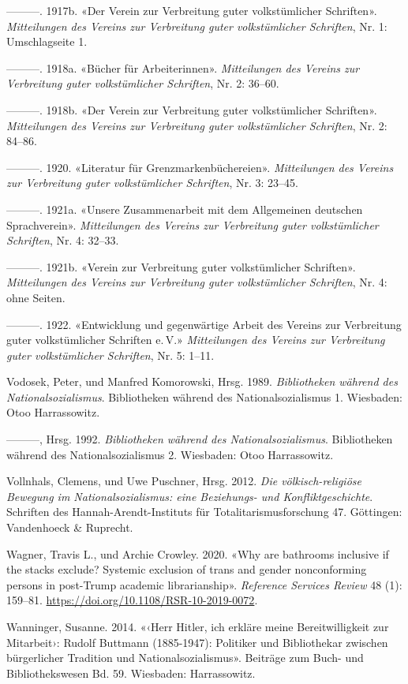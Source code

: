 \documentclass[a4paper,
fontsize=11pt,
oneside,
numbers=noperiodatend,
parskip=half-,
bibliography=totoc,
final
]{scrartcl}
\begin{document}
---------. 1917b. «Der Verein zur Verbreitung guter volkstümlicher
Schriften». \emph{Mitteilungen des Vereins zur Verbreitung guter
volkstümlicher Schriften}, Nr. 1: Umschlagseite 1.

---------. 1918a. «Bücher für Arbeiterinnen». \emph{Mitteilungen des
Vereins zur Verbreitung guter volkstümlicher Schriften}, Nr. 2: 36--60.

---------. 1918b. «Der Verein zur Verbreitung guter volkstümlicher
Schriften». \emph{Mitteilungen des Vereins zur Verbreitung guter
volkstümlicher Schriften}, Nr. 2: 84--86.

---------. 1920. «Literatur für Grenzmarkenbüchereien».
\emph{Mitteilungen des Vereins zur Verbreitung guter volkstümlicher
Schriften}, Nr. 3: 23--45.

---------. 1921a. «Unsere Zusammenarbeit mit dem Allgemeinen deutschen
Sprachverein». \emph{Mitteilungen des Vereins zur Verbreitung guter
volkstümlicher Schriften}, Nr. 4: 32--33.

---------. 1921b. «Verein zur Verbreitung guter volkstümlicher
Schriften». \emph{Mitteilungen des Vereins zur Verbreitung guter
volkstümlicher Schriften}, Nr. 4: ohne Seiten.

---------. 1922. «Entwicklung und gegenwärtige Arbeit des Vereins zur
Verbreitung guter volkstümlicher Schriften e.\,V.» \emph{Mitteilungen des
Vereins zur Verbreitung guter volkstümlicher Schriften}, Nr. 5: 1--11.

Vodosek, Peter, und Manfred Komorowski, Hrsg. 1989. \emph{Bibliotheken
während des Nationalsozialismus}. Bibliotheken während des
Nationalsozialismus 1. Wiesbaden: Otoo Harrassowitz.

---------, Hrsg. 1992. \emph{Bibliotheken während des
Nationalsozialismus}. Bibliotheken während des Nationalsozialismus 2.
Wiesbaden: Otoo Harrassowitz.

Vollnhals, Clemens, und Uwe Puschner, Hrsg. 2012. \emph{Die
völkisch-religiöse Bewegung im Nationalsozialismus: eine Beziehungs- und
Konfliktgeschichte}. Schriften des Hannah-Arendt-Instituts für
Totalitarismusforschung 47. Göttingen: Vandenhoeck \& Ruprecht.

Wagner, Travis L., und Archie Crowley. 2020. «Why are bathrooms
inclusive if the stacks exclude? Systemic exclusion of trans and gender
nonconforming persons in post-Trump academic librarianship».
\emph{Reference Services Review} 48 (1): 159--81.
\url{https://doi.org/10.1108/RSR-10-2019-0072}.

Wanninger, Susanne. 2014. «‹Herr Hitler, ich erkläre meine
Bereitwilligkeit zur Mitarbeit›: Rudolf Buttmann (1885-1947): Politiker
und Bibliothekar zwischen bürgerlicher Tradition und
Nationalsozialismus». Beiträge zum Buch- und Bibliothekswesen Bd. 59.
Wiesbaden: Harrassowitz.
\end{document}
